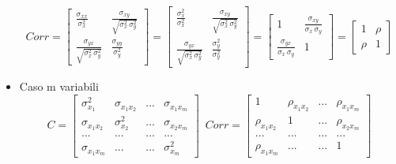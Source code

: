 \documentclass{article}
\begin{document}
\begin{itemize}
        $$Corr = \left[
             \begin{matrix}
                \frac{\sigma_{xx}}{\sigma^2_x}&\frac{\sigma_{xy}}{\sqrt{\sigma^2_x\,\sigma^2_y}}\\
                \frac{\sigma_{yx}}{\sqrt{\sigma^2_x\,\sigma^2_y}}& \frac{\sigma_{yy}}{\sigma^2_y}
             \end{matrix}
             \right]
             = 
                 \left[ 
                 \begin{matrix}
             \frac{\sigma^2_{x}}{\sigma^2_x}    &\frac{\sigma_{xy}}{\sqrt{\sigma^2_x\,\sigma^2_y}}\\
            \frac{\sigma_{yx}}{\sqrt{\sigma^2_x\,\sigma^2_y}}& \frac{\sigma^2_{y}}{\sigma^2_y}
                 \end{matrix}
                \right]
                =   \left[ 
                 \begin{matrix}
                 1 & \frac{\sigma_{xy}}{\sigma_x\,\sigma_y}\\
                  \frac{\sigma_{yx}}{\sigma_x\,\sigma_y}&1
                  \end{matrix}
                \right]
                = \left[ 
                 \begin{matrix}
                  1 & \rho\\
                  \rho &1
                  \end{matrix}
                \right]
                         $$ 
                \item Caso m variabili 
                $$C = \left[
             \begin{matrix}
                \sigma^2_{x_1}     &\sigma_{x_1x_2}  &...&\sigma_{x_1x_m}\\
                \sigma_{x_1x_2}  & \sigma^2_{x_2}    &...&\sigma_{x_2x_m}\\
                    ...          &             ... &...&          ...   \\
                \sigma_{x_1x_m}  & ...             & ...&\sigma^2_{x_m}
             \end{matrix} 
             \right]\,\,\,
              Corr = \left[
             \begin{matrix}
                1     &\rho_{x_1x_2}  &...&  \rho_{x_1x_m}\\
                \rho_{x_1x_2}  & 1    &...&  \rho_{x_2x_m}\\
                    ...        &  ... &...&         ...   \\
                \rho_{x_1x_m}  & ...  & ...&1
             \end{matrix} 
             \right]$$
             
         \end{itemize} 
\end{document}
